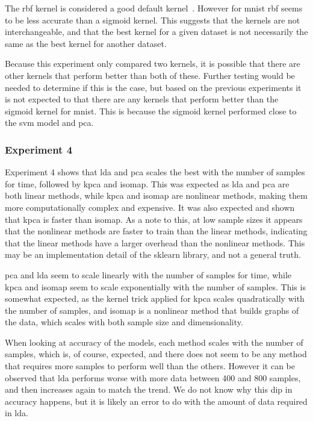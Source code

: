 The \gls{rbf} kernel is considered a good default kernel~\cite{scikit-learn}. However for \gls{mnist} \gls{rbf} seems to be less accurate than a sigmoid kernel. This suggests that the kernels are not interchangeable, and that the best kernel for a given dataset is not necessarily the same as the best kernel for another dataset.

Because this experiment only compared two kernels, it is possible that there are other kernels that perform better than both of these. Further testing would be needed to determine if this is the case, but based on the previous experiments it is not expected to that there are any kernels that perform better than the sigmoid kernel for \gls{mnist}. This is because the sigmoid kernel performed close to the \gls{svm} model and \gls{pca}.


\subsubsection{Experiment 4}\label{subsec:experiment-4}
Experiment 4 shows that \gls{lda} and \gls{pca} scales the best with the number of samples for time, followed by \gls{kpca} and \gls{isomap}. This was expected as \gls{lda} and \gls{pca} are both linear methods, while \gls{kpca} and \gls{isomap} are nonlinear methods, making them more computationally complex and expensive. It was also expected and shown that \gls{kpca} is faster than \gls{isomap}. As a note to this, at low sample sizes it appears that the nonlinear methods are faster to train than the linear methods, indicating that the linear methods have a larger overhead than the nonlinear methods. This may be an implementation detail of the \gls{sklearn} library, and not a general truth.

\gls{pca} and \gls{lda} seem to scale linearly with the number of samples for time, while \gls{kpca} and \gls{isomap} seem to scale exponentially with the number of samples. This is somewhat expected, as the kernel trick applied for \gls{kpca} scales quadratically with the number of samples, and \gls{isomap} is a nonlinear method that builds graphs of the data, which scales with both sample size and dimensionality.

When looking at accuracy of the models, each method scales with the number of samples, which is, of course, expected, and there does not seem to be any method that requires more samples to perform well than the others. However it can be observed that \gls{lda} performs worse with more data between 400 and 800 samples, and then increases again to match the trend. We do not know why this dip in accuracy happens, but it is likely an error to do with the amount of data required in \gls{lda}.




